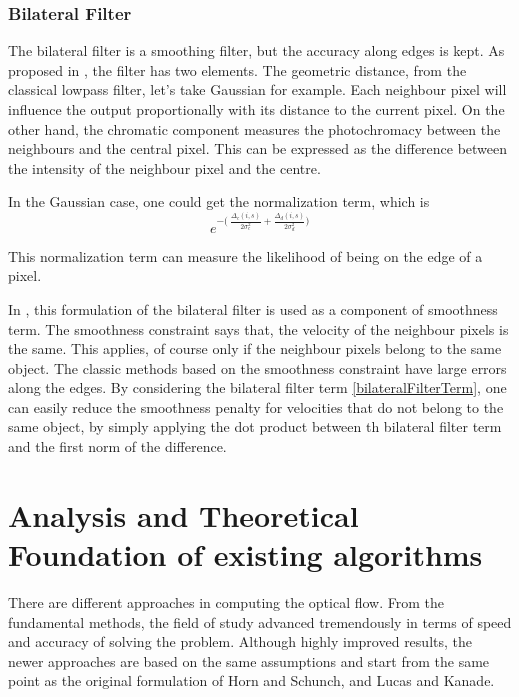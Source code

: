 \documentclass[12pt,a4paper,twoside]{report}
\begin{document}
\subsection{Bilateral Filter} \label{bf}
The bilateral filter is a smoothing filter, but the accuracy along edges is kept. 
As proposed in \cite{tomasi1998bilateral}, the filter has two elements. The geometric distance, from the classical lowpass filter, let's take Gaussian for example. Each neighbour pixel will influence the output proportionally with its distance to the current pixel. On the other hand, the chromatic component measures the photochromacy between the neighbours and the central pixel. This can be expressed as the difference between the intensity of the neighbour pixel and the centre. 

In the Gaussian case, one could get the normalization term, which is
\begin{equation} \label{bilateralFilterTerm}
	e^{-\big(\ \frac{\Delta_c(i,s)}{2\sigma_c^2}+ \frac{\Delta_d(i,s)}{2\sigma_d^2}\big)}
\end{equation}

This normalization term can measure the likelihood of being on the edge of a pixel. 

In \cite{drulea2013}, this formulation of the bilateral filter is used as a component of smoothness term. The smoothness constraint says that, the velocity of the neighbour pixels is the same. This applies, of course only if the neighbour pixels belong to the same object. The classic methods based on the smoothness constraint have large errors along the edges. By considering the bilateral filter term \ref{bilateralFilterTerm}, one can easily reduce the smoothness penalty for velocities that do not belong to the same object, by simply applying the dot product between th bilateral filter term and the first norm of the difference. 

\chapter{Analysis and Theoretical Foundation of existing algorithms}
\label{ch:analysis}

There are different approaches in computing the optical flow. From the fundamental methods, the field of study advanced tremendously in terms of speed and accuracy of solving the problem. Although highly improved results, the newer approaches are based on the same assumptions and start from the same point as the original formulation of Horn and Schunch, and Lucas and Kanade. 
\end{document}
